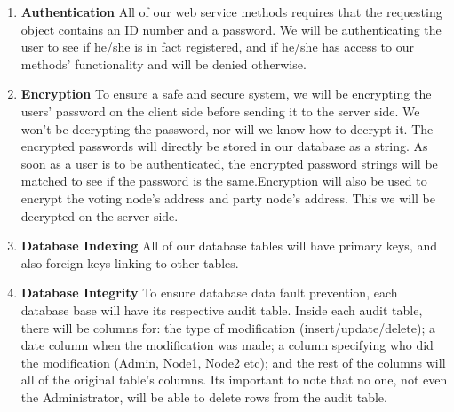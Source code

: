 \begin{enumerate}
		\item\textbf{Authentication}\newline
		All of our web service methods requires that the requesting object contains an ID number and a password. We will be authenticating the user to see if he/she is in fact registered, and if he/she has access to our methods' functionality and will be denied otherwise.
		
		\item\textbf{Encryption}\newline
		To ensure a safe and secure system, we will be encrypting the users' password on the client side before sending it to the server side. We won't be decrypting the password, nor will we know how to decrypt it. The encrypted passwords will directly be stored in our database as a string. As soon as a user is to be authenticated, the encrypted password strings will be matched to see if the password is the same.\newline Encryption will also be used to encrypt the voting node's address and party node's address. This we will be decrypted on the server side.
		
		\item\textbf{Database Indexing}\newline
		All of our database tables will have primary keys, and also foreign keys linking to other tables.
		
		\item\textbf{Database Integrity}\newline
		To ensure database data fault prevention, each database base will have its respective audit table. Inside each audit table, there will be columns for: the type of modification (insert/update/delete); a date column when the modification was made; a column specifying who did the modification (Admin, Node1, Node2 etc); and the rest of the columns will all of the original table's columns. Its important to note that no one, not even the Administrator, will be able to delete rows from the audit table.
\end{enumerate}	